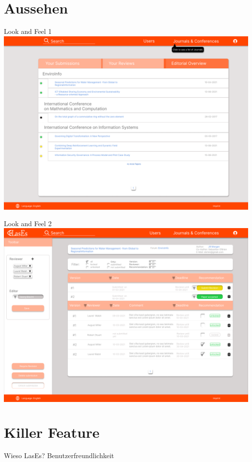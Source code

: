 \documentclass{beamer}
\begin{document}
    \section{Aussehen}
    \begin{frame}{Look and Feel 1}
        \centering
        \includegraphics[height=0.75\textheight]{../../docs/Pflichtenheft/graphics/Homepage-png}
    \end{frame}

    \begin{frame}{Look and Feel 2}
        \centering
        \includegraphics[height=0.75\textheight]{../../docs/Pflichtenheft/graphics/Submission-png}
    \end{frame}

    \section{Killer Feature}
    \begin{frame}{Wieso LasEs?}
        \centering
        \pause
        \huge Benutzerfreundlichkeit
    \end{frame}
\end{document}
